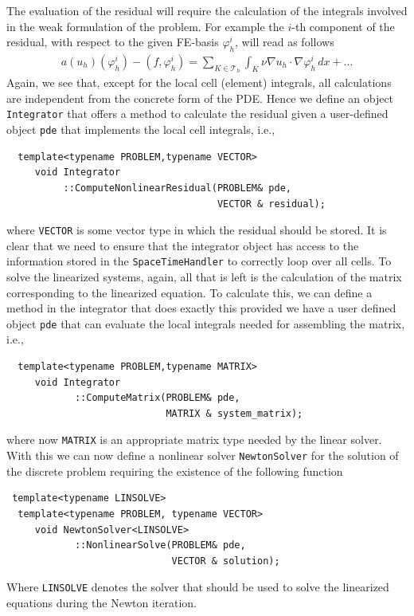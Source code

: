 \documentclass[smallextended]{svjour3}       %
\numberwithin{equation}{section}
\renewcommand{\phi}{\varphi}
\begin{document}
The evaluation of the residual will require the calculation of the integrals 
involved in the weak formulation of the problem. For example 
the $i$-th component of the residual, with respect to the given FE-basis 
$\phi_{h}^{i}$, will read as follows
\begin{align}\label{eq:residual_vector}
 a(u_h)(\phi_{h}^{i}) - (f,\phi_{h}^{i}) = \sum_{K\in \mathcal T_h} \int_K \nu\nabla u_h\cdot \nabla \phi_{h}^{i}\,dx + \ldots
 \end{align}
Again, we see that, except for the local cell (element) integrals, all 
calculations are independent from the concrete form of the PDE. 
Hence we define an object \texttt{Integrator}
that offers a method to calculate the residual given a user-defined 
object \texttt{pde} that implements the local cell integrals, i.e.,
\begin{lstlisting}
  template<typename PROBLEM,typename VECTOR>
     void Integrator
          ::ComputeNonlinearResidual(PROBLEM& pde, 
                                     VECTOR & residual);
\end{lstlisting}
where \texttt{VECTOR} is some vector type in which the residual 
should be stored.
It is clear that we need to ensure that the integrator object has access
to the information stored in the \texttt{SpaceTimeHandler}
to correctly loop over all cells.
To solve the linearized systems, again, all that is left is the calculation
of the matrix corresponding to the linearized equation. To calculate this,
 we can define a method in the integrator that does exactly this provided
we have a user defined object \texttt{pde} that can evaluate the local 
integrals needed for assembling the matrix, i.e.,
\begin{lstlisting}
  template<typename PROBLEM,typename MATRIX>
     void Integrator
            ::ComputeMatrix(PROBLEM& pde, 
                            MATRIX & system_matrix);
\end{lstlisting}
where now \texttt{MATRIX} is an appropriate matrix type needed by the 
linear solver.
With this we can now define a nonlinear solver \texttt{NewtonSolver} 
for the solution of the discrete problem requiring the existence of the 
following function
\begin{lstlisting}
 template<typename LINSOLVE>
  template<typename PROBLEM, typename VECTOR>
     void NewtonSolver<LINSOLVE>
            ::NonlinearSolve(PROBLEM& pde, 
                             VECTOR & solution);
\end{lstlisting}
Where \texttt{LINSOLVE} denotes the solver that should be used to solve the 
linearized equations during the Newton iteration.
\end{document}
